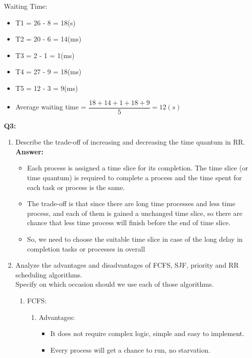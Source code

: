 \documentclass[a4paper]{article}
\newcommand{\tf}{\textbf}
\begin{document}
\begin{enumerate}
    \par{Waiting Time: } \\
    \begin{itemize}
        \item T1 = 26 - 8 = 18(s)
        \item T2 = 20 - 6 = 14(ms)
        \item T3 = 2 - 1 = 1(ms)
        \item T4 = 27 - 9 = 18(ms)
        \item T5 = 12 - 3 = 9(ms)
        \item Average waiting time = $\dfrac{18 + 14 + 1 + 18 + 9}{5} = 12(s)$
    \end{itemize}
\end{enumerate}

\tf{Q3:}
\begin{enumerate}[label = \alph*]
    \item Describe the trade-off of increasing and decreasing the time quantum in RR. \\
    \tf{Answer: } \\
    
    \begin{itemize}
        \item Each process is assigned a time slice for its completion. The time slice (or time quantum) is required to complete a process and the time spent for each task or process is the same.
        \item The trade-off is that since there are long time processes and less time process, and each of them is gained a unchanged time slice, so there are chance that less time process will finish before the end of time slice.
        \item So, we need to choose the suitable time slice in case of the long delay in completion tasks or processes in overall
    \end{itemize}

    \item Analyze the advantages and disadvantages of FCFS, SJF, priority and RR scheduling algorithms. \\
    Specify on which occasion should we use each of those algorithms. \\
    \begin{enumerate}
        \item FCFS:
        \begin{enumerate}
            \item Advantages:
            \begin{itemize}
                \item  It does not require complex logic, simple and easy to implement.
                \item Every process will get a chance to run, no starvation.
            \end{itemize}


\end{enumerate}
\end{enumerate}
\end{enumerate}
\end{document}
